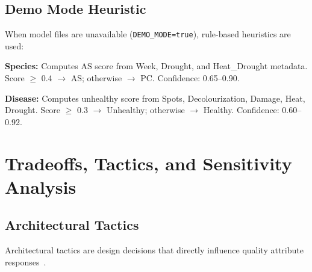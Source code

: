 \documentclass[11pt,a4paper,oneside]{report}
\newcommand{\code}[1]{\texttt{\footnotesize #1}}
\begin{document}
\section{Demo Mode Heuristic}

When model files are unavailable (\code{DEMO\_MODE=true}), rule-based heuristics are used:

\textbf{Species:} Computes AS score from Week, Drought, and Heat\_Drought metadata. Score $\geq$ 0.4 $\to$ AS; otherwise $\to$ PC. Confidence: 0.65--0.90.

\textbf{Disease:} Computes unhealthy score from Spots, Decolourization, Damage, Heat, Drought. Score $\geq$ 0.3 $\to$ Unhealthy; otherwise $\to$ Healthy. Confidence: 0.60--0.92.


\chapter{Tradeoffs, Tactics, and Sensitivity Analysis}

\section{Architectural Tactics}

Architectural tactics are design decisions that directly influence quality attribute responses~\cite{bass2024}.
\end{document}
